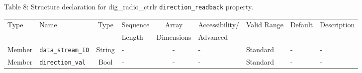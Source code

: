 \documentclass{article}
\def\comp{dig\_radio\_ctrlr}
\begin{document}
\begin{landscape}
	\noindent Table \hypertarget{tab8}{8}: Structure declaration for \comp{} \verb+direction_readback+ property.
	\begin{scriptsize}
		\noindent\begin{longtable}{|p{1.8cm}|p{3.6cm}|c|p{4cm}|c|p{2cm}|p{1.7cm}|p{0.8cm}|p{4.81cm}|}
			\hline
			\rowcolor{blue}
			Type         & Name                                & Type & Sequence & Array      & Accessibility/ & Valid Range  & Default & Description                                                                                                                                                                                                                       \\
			\rowcolor{blue}
			             &                                     &      & Length   & Dimensions & Advanced       &              &         &                                                                                                                                                                                                                             \\
			\hline
			Member       & \verb+data_stream_ID+               & String& -       & -          & -              & Standard     & -       & - \\
			\hline
			Member       & \verb+direction_val+                & Bool& -       & -          & -              & Standard & -       & - \\
			\hline
		\end{longtable}
	\end{scriptsize}




\end{landscape}
\end{document}
